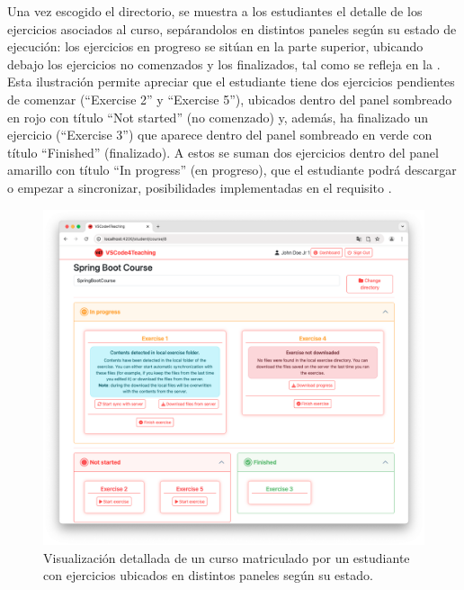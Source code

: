 Una vez escogido el directorio, se muestra a los estudiantes el detalle de los ejercicios asociados al curso, sepárandolos en distintos paneles según su estado de ejecución: los ejercicios en progreso se sitúan en la parte superior, ubicando debajo los ejercicios no comenzados y los finalizados, tal como se refleja en la . Esta ilustración permite apreciar que el estudiante tiene dos ejercicios pendientes de comenzar (``Exercise 2'' y ``Exercise 5''), ubicados dentro del panel sombreado en rojo con título ``Not started'' (no comenzado) y, además, ha finalizado un ejercicio (``Exercise 3'') que aparece dentro del panel sombreado en verde con título ``Finished'' (finalizado). A estos se suman dos ejercicios dentro del panel amarillo con título ``In progress'' (en progreso), que el estudiante podrá descargar o empezar a sincronizar, posibilidades implementadas en el requisito .

\begin{figure}[ht]
    \centering
    \includegraphics[width=\textwidth]{imagenes/utilizadas/4-3-implementacion/rf9-2.png}
    \caption{Visualización detallada de un curso matriculado por un estudiante con ejercicios ubicados en distintos paneles según su estado.}
    \label{fig:reqf9-2}
\end{figure}
